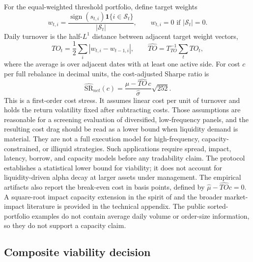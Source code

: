 \documentclass[12pt,a4paper]{article}
\newcommand{\SR}{\mathrm{SR}}
\DeclareMathOperator{\sign}{sign}
\begin{document}
For the equal-weighted threshold portfolio, define target weights
\begin{equation}
  w_{t,i} =
  \frac{\sign(s_{t,i})\mathbf 1\{i\in\mathcal S_t\}}
       {|\mathcal S_t|},
  \qquad w_{t,i}=0 \text{ if } |\mathcal S_t|=0 .
\end{equation}
Daily turnover is the half-\(L^1\) distance between adjacent target
weight vectors,
\begin{equation}
  TO_t = \frac{1}{2}\sum_i |w_{t,i}-w_{t-1,i}|,
  \qquad
  \widehat{TO}=T_{TO}^{-1}\sum_t TO_t ,
  \label{eq:turnover}
\end{equation}
where the average is over adjacent dates with at least one active side.
For cost \(c\) per full rebalance in decimal units, the cost-adjusted
Sharpe ratio is
\begin{equation}
  \widehat{\SR}_{net}(c)
  = \frac{\hat\mu-\widehat{TO}\,c}{\hat\sigma}\sqrt{252}.
  \label{eq:net-sr}
\end{equation}
This is a first-order cost stress.  It assumes linear cost per unit of
turnover and holds the return volatility fixed after subtracting costs.
Those assumptions are reasonable for a screening evaluation of diversified,
low-frequency panels, and the resulting cost drag should be read as a
lower bound when liquidity demand is material.  They are not a full execution model for
high-frequency, capacity-constrained, or illiquid strategies.  Such
applications require spread, impact, latency, borrow, and capacity
models before any tradability claim.  The protocol establishes a
statistical lower bound for viability; it does not account for
liquidity-driven alpha decay at larger assets under management.
The empirical artifacts also report the break-even cost in basis points,
defined by \(\hat\mu-\widehat{TO}c=0\).  A square-root impact capacity
extension in the spirit of \citet{almgren2001optimal} and the broader
market-impact literature \citep{bouchaud2008markets} is provided in the
technical appendix.  The public sorted-portfolio examples do not contain
average daily volume or order-size information, so they do not support a
capacity claim.

\subsection{Composite viability decision}
\end{document}
